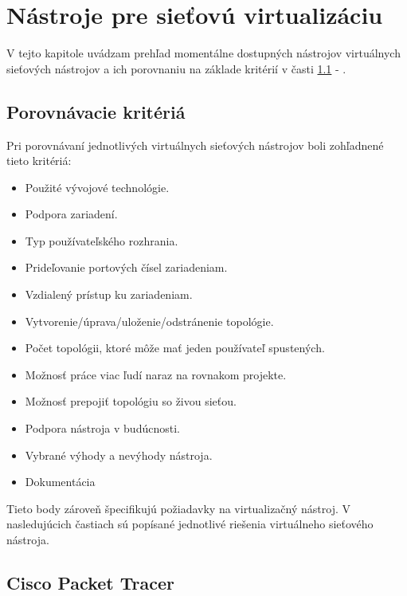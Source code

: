 \chapter{Nástroje pre sieťovú virtualizáciu}
\label{chap:nastroje_pre_siet_virt}

V tejto kapitole uvádzam prehľad momentálne dostupných nástrojov virtuálnych sieťových nástrojov a ich porovnaniu na základe kritérií v časti \ref{chap:porovnavacie_kriteria} - .





\section{Porovnávacie kritériá}
\label{chap:porovnavacie_kriteria}

Pri porovnávaní jednotlivých virtuálnych sieťových nástrojov boli zohľadnené tieto kritériá:
\begin{itemize}[noitemsep]
    \item Použité vývojové technológie.
    \item Podpora zariadení.
    \item Typ používateľského rozhrania.
    \item Prideľovanie portových čísel zariadeniam.
    \item Vzdialený prístup ku zariadeniam.
    \item Vytvorenie/úprava/uloženie/odstránenie topológie.
    \item Počet topológii, ktoré môže mať jeden používateľ spustených.
    \item Možnosť práce viac ľudí naraz na rovnakom projekte.
    \item Možnosť prepojiť topológiu so živou sieťou.
    \item Podpora nástroja v budúcnosti.
    \item Vybrané výhody a nevýhody nástroja.
    \item Dokumentácia
\end{itemize}

Tieto body zároveň špecifikujú požiadavky na virtualizačný nástroj. V nasledujúcich častiach sú popísané jednotlivé riešenia virtuálneho sieťového nástroja.





\section{Cisco Packet Tracer}

